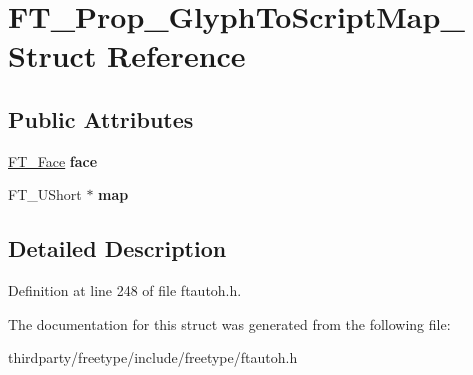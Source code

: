 \hypertarget{struct_f_t___prop___glyph_to_script_map__}{}\section{F\+T\+\_\+\+Prop\+\_\+\+Glyph\+To\+Script\+Map\+\_\+ Struct Reference}
\label{struct_f_t___prop___glyph_to_script_map__}
\subsection*{Public Attributes}
\begin{DoxyCompactItemize}
\item 
\mbox{\label{struct_f_t___prop___glyph_to_script_map___a08fa6630173f5351bf5bf8e54ab0adcf}} 
\hyperlink{struct_f_t___face_rec__}{F\+T\+\_\+\+Face} {\bfseries face}
\item 
\mbox{\label{struct_f_t___prop___glyph_to_script_map___ab7e1c8285f5263a6c4b03ac8d2fb029d}} 
F\+T\+\_\+\+U\+Short $\ast$ {\bfseries map}
\end{DoxyCompactItemize}


\subsection{Detailed Description}


Definition at line 248 of file ftautoh.\+h.



The documentation for this struct was generated from the following file\+:\begin{DoxyCompactItemize}
\item 
thirdparty/freetype/include/freetype/ftautoh.\+h\end{DoxyCompactItemize}
